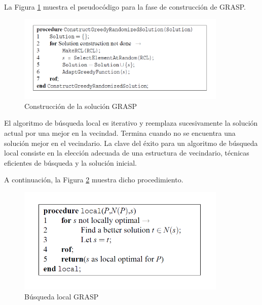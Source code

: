 \documentclass[a4paper,12pt]{book}
\begin{document}
		La Figura \ref{GRASPconstructionphase} muestra el pseudocódigo para la fase de construcción de GRASP.
	
		\begin{figure}[h]
			\centering
			\includegraphics[width=10cm]{./Graphics/GRASPconstructionphase.png}
			\caption{Construcción de la solución GRASP}
			\label{GRASPconstructionphase}
		\end{figure}
	
		El algoritmo de búsqueda local es iterativo y reemplaza sucesivamente la solución actual por una mejor en la vecindad. Termina cuando no se encuentra una solución mejor en el vecindario. La clave del éxito para un algoritmo de búsqueda local consiste en la elección adecuada de una estructura de vecindario, técnicas eficientes de búsqueda y la solución inicial.
		
		A continuación, la Figura \ref{GRASPlocal} muestra dicho procedimiento.
		
		\begin{figure}[h]
			\centering
			\includegraphics[width=10cm]{./Graphics/GRASPlocal.png}
			\caption{Búsqueda local GRASP}
			\label{GRASPlocal}
		\end{figure}
	
\end{document}

